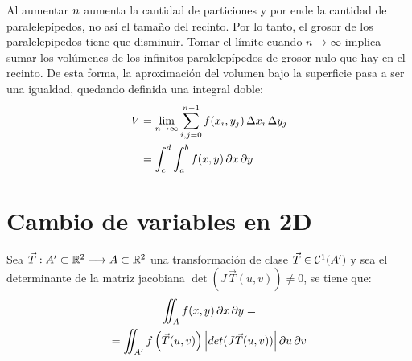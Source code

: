 Al aumentar $n$ aumenta la cantidad de particiones y por ende la cantidad de paralelepípedos, no así el tamaño del recinto.
Por lo tanto, el grosor de los paralelepipedos tiene que disminuir.
Tomar el límite cuando $n\to\infty$ implica sumar los volúmenes de los infinitos paralelepípedos de grosor nulo que hay en el recinto.
De esta forma, la aproximación del volumen bajo la superficie pasa a ser una igualdad, quedando definida una integral doble:
\begin{align*}
    V &= \lim_{n\to\infty} \sum_{i,j=0}^{n-1} f(x_i,y_j) \, \Delta x_i \, \Delta y_j
    \\
    &= \int_c^d \int_a^b f(x,y) \, \partial x \, \partial y
\end{align*}

\begin{mdframed}[style=PropertyFrame]
    \begin{prop}
    \end{prop}
\end{mdframed}


\section*{Cambio de variables en 2D}

Sea $\Vec{T}:A' \subset \mathbb{R}^2 \longrightarrow A \subset \mathbb{R}^2$ una transformación de clase $\Vec{T} \in \mathcal{C}^{1} (A')$ y sea el determinante de la matriz jacobiana $\operatorname{det}(J \, \Vec{T}(u,v)) \neq 0$, se tiene que:
\begin{multline*}
    \iint_A f(x,y) \, \partial x \, \partial y =
    \\
    = \iint_{A'} f \left( \Vec{T}(u,v) \right) {\left| { det(J \Vec{T}(u,v)) } \right|} \, \partial u \, \partial v
\end{multline*}

\begin{center}
    \def\svgwidth{0.8\linewidth}
    
\end{center}

